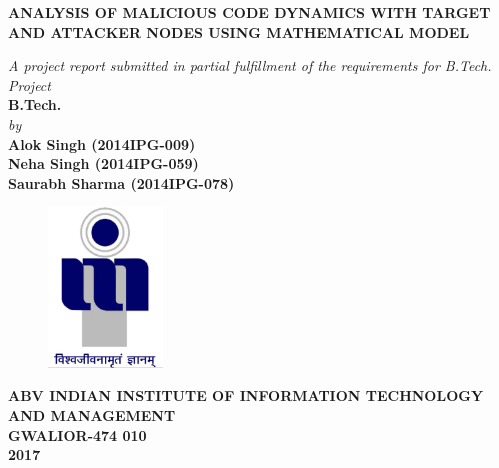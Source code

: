 \title{}
\author{}
\thispagestyle{empty}

\begin{titlepage}
\begin{center}
{\Large \bf  {ANALYSIS OF MALICIOUS CODE DYNAMICS WITH TARGET AND ATTACKER NODES USING MATHEMATICAL MODEL}}
\end{center}
\vspace{0.6in}
\begin{center}
{\large \it {A project report submitted in partial fulfillment of the requirements for B.Tech. Project}} \\
\vspace{0.6in}
{\large \bf B.Tech.} \\
\vspace{0.5in}
{\large \it by\\}
\vspace{0.3in}
{\large \bf Alok Singh (2014IPG-009)}\\
{\large \bf Neha Singh (2014IPG-059)}\\
{\large \bf Saurabh Sharma (2014IPG-078)}\\
\end{center}
\vspace{0.8in}
\begin{center}
\begin{figure}[h]
\centerline{\includegraphics[width=1.2in]{iiitm}}
\end{figure}
\end{center}
\begin{center}
{\Large \bf ABV INDIAN INSTITUTE OF INFORMATION TECHNOLOGY AND MANAGEMENT\\
GWALIOR-474 010\\}
\vspace{0.2in}
{\Large \bf 2017\\}
\end{center}
\end{titlepage}
